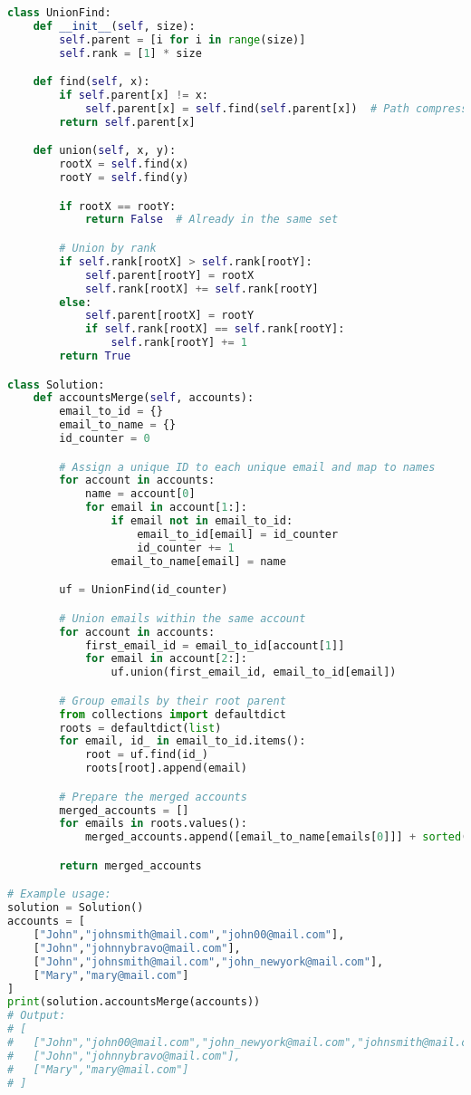 \begin{fullwidth}
\begin{lstlisting}[language=Python]
class UnionFind:
    def __init__(self, size):
        self.parent = [i for i in range(size)]
        self.rank = [1] * size

    def find(self, x):
        if self.parent[x] != x:
            self.parent[x] = self.find(self.parent[x])  # Path compression
        return self.parent[x]

    def union(self, x, y):
        rootX = self.find(x)
        rootY = self.find(y)

        if rootX == rootY:
            return False  # Already in the same set

        # Union by rank
        if self.rank[rootX] > self.rank[rootY]:
            self.parent[rootY] = rootX
            self.rank[rootX] += self.rank[rootY]
        else:
            self.parent[rootX] = rootY
            if self.rank[rootX] == self.rank[rootY]:
                self.rank[rootY] += 1
        return True

class Solution:
    def accountsMerge(self, accounts):
        email_to_id = {}
        email_to_name = {}
        id_counter = 0

        # Assign a unique ID to each unique email and map to names
        for account in accounts:
            name = account[0]
            for email in account[1:]:
                if email not in email_to_id:
                    email_to_id[email] = id_counter
                    id_counter += 1
                email_to_name[email] = name

        uf = UnionFind(id_counter)

        # Union emails within the same account
        for account in accounts:
            first_email_id = email_to_id[account[1]]
            for email in account[2:]:
                uf.union(first_email_id, email_to_id[email])

        # Group emails by their root parent
        from collections import defaultdict
        roots = defaultdict(list)
        for email, id_ in email_to_id.items():
            root = uf.find(id_)
            roots[root].append(email)

        # Prepare the merged accounts
        merged_accounts = []
        for emails in roots.values():
            merged_accounts.append([email_to_name[emails[0]]] + sorted(emails))

        return merged_accounts

# Example usage:
solution = Solution()
accounts = [
    ["John","johnsmith@mail.com","john00@mail.com"],
    ["John","johnnybravo@mail.com"],
    ["John","johnsmith@mail.com","john_newyork@mail.com"],
    ["Mary","mary@mail.com"]
]
print(solution.accountsMerge(accounts))
# Output:
# [
#   ["John","john00@mail.com","john_newyork@mail.com","johnsmith@mail.com"],
#   ["John","johnnybravo@mail.com"],
#   ["Mary","mary@mail.com"]
# ]
\end{lstlisting}
\end{fullwidth}

